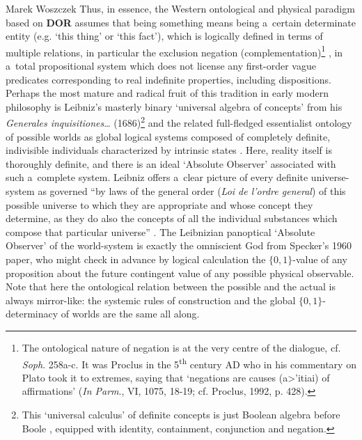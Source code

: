 \begin{artengenv}{Marek Woszczek}
Thus, in essence, the Western ontological and physical paradigm based on \textbf{DOR} assumes that being something means being a~certain determinate entity (e.g. ‘this thing' or ‘this fact'), which is logically defined in terms of multiple relations, in particular the exclusion negation (complementation)\footnote{The ontological nature of negation is at the very centre of the dialogue, cf. \textit{Soph}. 258a-c. It was Proclus in the 5\textsuperscript{th} century AD who in his commentary on Plato took it to extremes, saying that ‘negations are causes (\textgreek{a>'itiai}) of affirmations' (\textit{In Parm}., VI, 1075, 18-19; cf. Proclus, 1992, p. 428).} , in a~total propositional system which does not license any first-order vague predicates corresponding to real indefinite properties, including dispositions. Perhaps the most mature and radical fruit of this tradition in early modern philosophy is Leibniz's masterly binary ‘universal algebra of concepts' from his \textit{Generales inquisitiones}… (1686)\footnote{This ‘universal calculus' of definite concepts is just Boolean algebra before Boole
\parencites[][]{lenzen_leibniz_1984}[][]{lenzen_leibniz_1984}, %
 equipped with identity, containment, conjunction and negation.} and the related full-fledged essentialist ontology of possible worlds as global logical systems composed of completely definite, indivisible individuals characterized by intrinsic states 
\parencite[see e.g.][]{bella_science_2005}. %
 Here, reality itself is thoroughly definite, and there is an ideal ‘Absolute Observer' associated with such a~complete system. Leibniz offers a~clear picture of every definite universe-system as governed “by laws of the general order (\textit{Loi de l'ordre general}) of this possible universe to which they are appropriate and whose concept they determine, as they do also the concepts of all the individual substances which compose that particular universe'' 
\parencites[][]{}[][p.73]{leibniz_samtliche_2009}. %
 The Leibnizian panoptical ‘Absolute Observer' of the world-system is exactly the omniscient God from Specker's 1960 paper, who might check in advance by logical calculation the $\{0,1\}${}-value of any proposition about the future contingent value of any possible physical observable. Note that here the ontological relation between the possible and the actual is always mirror-like: the systemic rules of construction and the global $\{0,1\}${}-determinacy of worlds are the same all along.


\end{artengenv}
